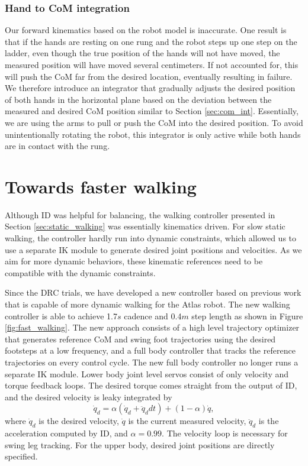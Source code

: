 \documentclass{ws-ijhr}
\newcommand{\fref}[1] {Figure \ref{#1}}
\newcommand{\sref}[1] {Section \ref{#1}}
\begin{document}
\subsubsection{Hand to CoM integration}
Our forward kinematics based on the robot model is inaccurate. 
One result is that if 
the hands are resting on one rung and the robot steps up one step on the 
ladder, even though the true position of the hands will not have moved, the 
measured position will have moved several centimeters. If not accounted for, 
this will push the CoM far from the desired location, eventually resulting 
in failure. We therefore introduce an integrator that gradually adjusts the 
desired position of both hands in the horizontal plane based on the deviation 
between the measured and desired CoM position similar to \sref{sec:com_int}. 
Essentially, we are using the 
arms to pull or push the CoM into the desired position. To avoid unintentionally 
rotating the robot, this integrator is only active while both hands are in 
contact with the rung. 

\section{Towards faster walking}
\label{sec:new_stuff}
Although ID was helpful for balancing, the walking controller presented in 
\sref{sec:static_walking} was essentially kinematics driven. 
For slow static walking, the controller hardly run into dynamic constraints, 
which allowed us to use a separate IK module to generate desired joint 
positions and velocities. 
As we aim for more dynamic behaviors, these kinematic references need to be 
compatible with the dynamic constraints. 

Since the DRC trials, we have developed a new controller based on previous 
work \cite{sfeng_online,sfeng_proposal} that is capable of more dynamic walking
for the Atlas robot. 
The new walking controller is able to achieve 1.7$s$ cadence and 0.4$m$
step length as shown in \fref{fig:fast_walking}. 
The new approach consists of a high level trajectory optimizer that generates
reference CoM and swing foot trajectories using the desired footsteps at a low
frequency, and a full body controller that tracks the reference trajectories 
on every control cycle. 
The new full body controller no longer runs a separate IK module. 
Lower body joint level servos consist of only velocity and torque feedback 
loops. 
The desired torque comes straight from the output of ID, and the desired 
velocity is leaky integrated by
\begin{equation}
  \dot{q}_d = \alpha (\dot{q}_d + \ddot{q}_d dt) + (1-\alpha) \dot{q},
	\label{eq:qd_int}
\end{equation} 
where $\dot{q}_d$ is the desired velocity, $\dot{q}$ is the current 
measured velocity, $\ddot{q}_d$ is the acceleration computed by ID, and $\alpha = 0.99$. 
The velocity loop is necessary for swing leg tracking. 
For the upper body, desired joint positions are directly specified.
\end{document}
